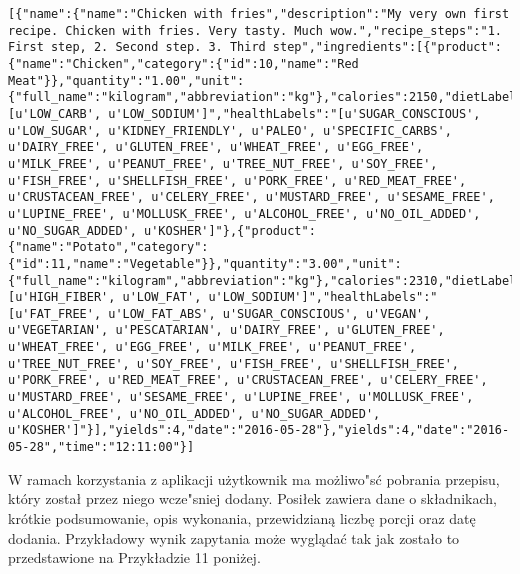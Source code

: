 \documentclass{article}
\begin{document}
\begin{lstlisting}[label=meal_api,caption=Pobranie posiłku,breaklines=true]
[{"name":{"name":"Chicken with fries","description":"My very own first recipe. Chicken with fries. Very tasty. Much wow.","recipe_steps":"1. First step, 2. Second step. 3. Third step","ingredients":[{"product":{"name":"Chicken","category":{"id":10,"name":"Red Meat"}},"quantity":"1.00","unit":{"full_name":"kilogram","abbreviation":"kg"},"calories":2150,"dietLabels":"[u'LOW_CARB', u'LOW_SODIUM']","healthLabels":"[u'SUGAR_CONSCIOUS', u'LOW_SUGAR', u'KIDNEY_FRIENDLY', u'PALEO', u'SPECIFIC_CARBS', u'DAIRY_FREE', u'GLUTEN_FREE', u'WHEAT_FREE', u'EGG_FREE', u'MILK_FREE', u'PEANUT_FREE', u'TREE_NUT_FREE', u'SOY_FREE', u'FISH_FREE', u'SHELLFISH_FREE', u'PORK_FREE', u'RED_MEAT_FREE', u'CRUSTACEAN_FREE', u'CELERY_FREE', u'MUSTARD_FREE', u'SESAME_FREE', u'LUPINE_FREE', u'MOLLUSK_FREE', u'ALCOHOL_FREE', u'NO_OIL_ADDED', u'NO_SUGAR_ADDED', u'KOSHER']"},{"product":{"name":"Potato","category":{"id":11,"name":"Vegetable"}},"quantity":"3.00","unit":{"full_name":"kilogram","abbreviation":"kg"},"calories":2310,"dietLabels":"[u'HIGH_FIBER', u'LOW_FAT', u'LOW_SODIUM']","healthLabels":"[u'FAT_FREE', u'LOW_FAT_ABS', u'SUGAR_CONSCIOUS', u'VEGAN', u'VEGETARIAN', u'PESCATARIAN', u'DAIRY_FREE', u'GLUTEN_FREE', u'WHEAT_FREE', u'EGG_FREE', u'MILK_FREE', u'PEANUT_FREE', u'TREE_NUT_FREE', u'SOY_FREE', u'FISH_FREE', u'SHELLFISH_FREE', u'PORK_FREE', u'RED_MEAT_FREE', u'CRUSTACEAN_FREE', u'CELERY_FREE', u'MUSTARD_FREE', u'SESAME_FREE', u'LUPINE_FREE', u'MOLLUSK_FREE', u'ALCOHOL_FREE', u'NO_OIL_ADDED', u'NO_SUGAR_ADDED', u'KOSHER']"}],"yields":4,"date":"2016-05-28"},"yields":4,"date":"2016-05-28","time":"12:11:00"}]
\end{lstlisting}

W ramach korzystania z aplikacji użytkownik ma możliwo"sć pobrania przepisu, który został przez niego wcze"sniej dodany. Posiłek zawiera dane o składnikach, krótkie podsumowanie, opis wykonania, przewidzianą liczbę porcji oraz datę dodania. Przykładowy wynik zapytania może wyglądać tak jak zostało to przedstawione na Przykładzie 11 poniżej.
\end{document}
